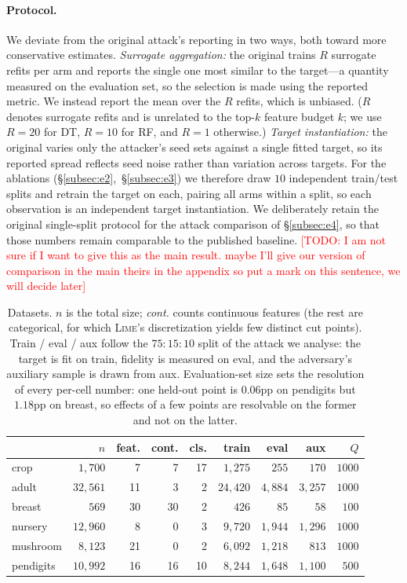 \documentclass[sigconf,anonymous,review]{acmart}
\newcommand{\TODO}[1]{\textcolor{red}{[TODO: #1]}}
\begin{document}
\paragraph{Protocol.} We deviate from the original attack's reporting in two ways, both toward more
conservative estimates. \emph{Surrogate aggregation:} the original trains $R$ surrogate refits per
arm and reports the single one most similar to the target---a quantity measured on the evaluation set,
so the selection is made using the reported metric. We instead report the mean over the $R$ refits,
which is unbiased. ($R$ denotes surrogate refits and is unrelated to the top-$k$ feature budget $k$;
we use $R{=}20$ for DT, $R{=}10$ for RF, and $R{=}1$ otherwise.)
\emph{Target instantiation:} the original varies only the attacker's seed sets against a single fitted
target, so its reported spread reflects seed noise rather than variation across targets. For the
ablations (\S\ref{subsec:e2},~\S\ref{subsec:e3}) we therefore draw $10$ independent train/test splits
and retrain the target on each, pairing all arms within a split, so each observation is an independent
target instantiation. 
We deliberately retain the original single-split protocol for the attack
comparison of \S\ref{subsec:e4}, so that those numbers remain comparable to the published baseline. \TODO{I am not sure if I want to give this as the main result. maybe I'll give our version of comparison in the main theirs in the appendix so put a mark on this sentence, we will decide later}

\begin{table}[t]
\centering
\caption{Datasets. $n$ is the total size; \emph{cont.} counts continuous features (the rest are
categorical, for which \textsc{Lime}'s discretization yields few distinct cut points). Train / eval /
aux follow the $75\!:\!15\!:\!10$ split of the attack we analyse: the target is fit on train, fidelity
is measured on eval, and the adversary's auxiliary sample is drawn from aux. Evaluation-set size sets
the resolution of every per-cell number: one held-out point is $0.06$pp on pendigits but $1.18$pp on
breast, so effects of a few points are resolvable on the former and not on the latter.}
\label{tab:datasets}
\begin{tabular}{lrrrrrrrr}
\toprule
 & $n$ & feat. & cont. & cls. & train & eval & aux & $Q$ \\
\midrule
crop      & $1{,}700$  & 7  & 7  & 17 & $1{,}275$  & $255$   & $170$   & $1000$ \\
adult     & $32{,}561$ & 11 & 3  & 2  & $24{,}420$ & $4{,}884$ & $3{,}257$ & $1000$ \\
breast    & $569$      & 30 & 30 & 2  & $426$      & $85$    & $58$    & $100$  \\
nursery   & $12{,}960$ & 8  & 0  & 3  & $9{,}720$  & $1{,}944$ & $1{,}296$ & $1000$ \\
mushroom  & $8{,}123$  & 21 & 0  & 2  & $6{,}092$  & $1{,}218$ & $813$   & $1000$ \\
pendigits & $10{,}992$ & 16 & 16 & 10 & $8{,}244$  & $1{,}648$ & $1{,}100$ & $500$  \\
\bottomrule
\end{tabular}
\end{table}
\end{document}
